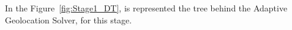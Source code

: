  In the Figure~\ref{fig:Stage1_DT}, is represented the tree behind the Adaptive Geolocation Solver, for this stage. 
 \newline\newline\newline 







